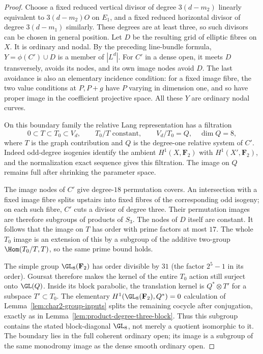 \begin{proof}
Choose a fixed reduced vertical divisor of degree $3(d-m_2)$
linearly equivalent to $3(d-m_2)O$ on $E_1$, and a fixed
reduced horizontal divisor of degree $3(d-m_1)$ similarly.
These degrees are at least three, so such divisors can be
chosen in general position. Let $D$ be the resulting grid
of elliptic fibres on $X$.
It is ordinary and nodal. By the preceding line-bundle formula,
$Y=\phi(C')\cup D$ is a member of $|L^d|$.
For $C'$ in a dense open, it meets $D$ transversely, avoids its
nodes, and its own image nodes avoid $D$.
The last avoidance is also an elementary incidence condition:
for a fixed image fibre, the two value conditions at $P,P+g$
have $P$ varying in dimension one, and so have proper image
in the coefficient projective space.
All these $Y$ are ordinary nodal curves.

On this boundary family the relative Lang representation has
a filtration
\[
       0\subset T\subset T_0\subset V_d,
 \qquad T_0/T\text{ constant},\qquad
 V_d/T_0=Q,\quad\dim Q=8,
\]
where $T$ is the graph contribution and $Q$ is the degree-one
relative system of $C'$.
Indeed odd-degree isogenies identify the ambient
$H^1(X,\mathbf F_2)$ with $H^1(X',\mathbf F_2)$, and the
normalization exact sequence gives this filtration.
The image on $Q$ remains full after shrinking the parameter
space.

The image nodes of $C'$ give degree-$18$ permutation covers.
An intersection with a fixed image fibre splits upstairs into
fixed fibres of the corresponding odd isogeny; on each such
fibre, $C'$ cuts a divisor of degree three.
Their permutation images are therefore subgroups of products
of $S_3$. The nodes of $D$ itself are constant.
It follows that the image on $T$ has order with prime factors
at most $17$. The whole $T_0$ image is an extension of this
by a subgroup of the additive two-group
$\Hom(T_0/T,T)$, so the same prime bound holds.

The simple group $\GL_8(\mathbf F_2)$ has order divisible by
$31$ (the factor $2^5-1$ in its order).
Goursat therefore makes the kernel of the entire $T_0$ action
still surject onto $\GL(Q)$.
Inside its block parabolic, the translation kernel is
$Q^*\otimes T'$ for a subspace $T'\subset T_0$.
The elementary $H^1(\GL_8(\mathbf F_2),Q^*)=0$ calculation
of Lemma~\ref{lem:char2-group-inputs} splits the remaining
cocycle after conjugation, exactly as in
Lemma~\ref{lem:product-degree-three-block}.
Thus this subgroup contains the stated block-diagonal
$\GL_8$, not merely a quotient isomorphic to it.
The boundary lies in the full coherent ordinary open; its
image is a subgroup of the same monodromy image as the dense
smooth ordinary open.
\end{proof}

